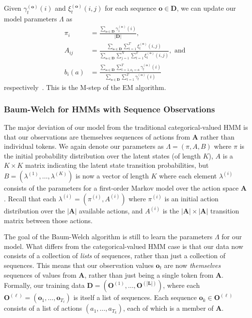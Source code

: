 Given $\gamma^{(\mathbf{o})}_t(i)$ and $\xi^{(\mathbf{o})}_t(i,j)$ for each
sequence $\mathbf{o} \in \mathbf{D}$, we can update our model parameters
$\Lambda$ as
\begin{align}
  \pi_i &= \frac{\sum_{\mathbf{o} \in \mathbf{D}}
  \gamma^{(\mathbf{o})}_1(i)}{|\mathbf{D}|},\\
  A_{ij} &= \frac{\sum_{\mathbf{o} \in \mathbf{D}} \sum_{t=1}^T
  \xi^{(\mathbf{o})}_t(i,j)} {\sum_{\mathbf{o} \in \mathbf{D}} \sum_{j=1}^N
  \sum_{t=1}^T \xi^{(\mathbf{o})}_t(i,j)},
  \text{ and }\\
  b_i(a) &= \frac{\sum_{\mathbf{o} \in \mathbf{D}} \sum_{t=1, o_t = a}^T
  \gamma^{(\mathbf{o})}_t(i)} {\sum_{\mathbf{o} \in \mathbf{D}}
  \sum_{t=1}^T \gamma^{(\mathbf{o})}_t(i)}
\end{align}
respectively~\cite{Rabiner:1990:RSR}. This is the M-step of the EM
algorithm.

\subsubsection{Baum-Welch for HMMs with Sequence Observations}
The major deviation of our model from the traditional categorical-valued
HMM is that our observations are themselves sequences of actions from
$\mathbf{A}$ rather than individual tokens. We again denote our parameters
as $\Lambda = (\pi, A, B)$ where $\pi$ is the initial probability
distribution over the latent states (of length $K$), $A$ is a $K \times K$
matrix indicating the latent state transition probabilities, but $B =
(\lambda^{(1)}, \ldots, \lambda^{(K)})$ is now a vector of length $K$ where
each element $\lambda^{(i)}$ consists of the parameters for a first-order
Markov model over the action space $\mathbf{A}$. Recall that each
$\lambda^{(i)} = (\pi^{(i)}, A^{(i)})$ where $\pi^{(i)}$ is an initial
action distribution over the $|\mathbf{A}|$ available actions, and
$A^{(i)}$ is the $|\mathbf{A}| \times |\mathbf{A}|$ transition matrix
between those actions.

The goal of the Baum-Welch algorithm is still to learn the parameters
$\Lambda$ for our model. What differs from the categorical-valued HMM case
is that our data now consists of a collection of \emph{lists} of sequences,
rather than just a collection of sequences. This means that our observation
values $\mathbf{o}_t$ are now \emph{themselves} sequences of values from
$\mathbf{A}$, rather than just being a single token from $\mathbf{A}$.
Formally, our training data $\mathbf{D} = (\mathbf{O}^{(1)}, \ldots,
\mathbf{O}^{(|\mathbf{L}|)})$, where each $\mathbf{O}^{(\ell)} = (\mathbf{o}_1,
\ldots, \mathbf{o}_{T_\ell})$ is itself a list of sequences. Each sequence
$\mathbf{o}_k \in \mathbf{O}^{(\ell)}$ consists of a list of actions $(a_1,
\ldots, a_{T_k})$, each of which is a member of $\mathbf{A}$.

